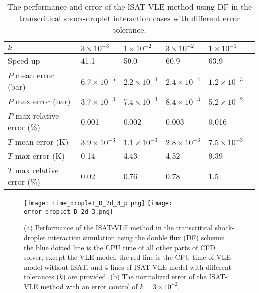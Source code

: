 \begin{table}%
	\caption{The performance and error of the ISAT-VLE method using DF in the transcritical shock-droplet interaction cases with different error tolerance.}\label{droplet_DF_table}
	\begin{tabular*}{0.9\textwidth}{@{} l|lllll@{} }
		\toprule
		$k$                        & $3\times 10^{-3}$   & $1\times 10^{-2}$    &$3\times 10^{-2}$    & $1\times 10^{-1}$\\
		\midrule
		Speed-up                   & 41.1                & 50.0                 & 60.9                & 63.9\\
		$P$ mean error (bar)       & $6.7\times 10^{-5}$ & $2.2\times 10^{-4}$  & $2.4\times 10^{-4}$ & $1.2\times 10^{-3}$\\
		$P$ max error (bar)        & $3.7\times 10^{-3}$ & $7.4\times 10^{-3}$  & $8.4\times 10^{-3}$ & $5.2\times 10^{-2}$ \\
		$P$ max relative error (\%)& 0.001               & 0.002                & 0.003               & 0.016 \\
		$T$ mean error (K)         & $3.9\times 10^{-3}$ & $1.1\times 10^{-3}$  & $2.8\times 10^{-3}$ & $7.5\times 10^{-3}$\\
		$T$ max error (K)          & 0.14                & 4.43                 & 4.52                & 9.39\\
		$T$ max relative error (\%)& 0.02                & 0.76                 & 0.78                & 1.5 \\
		\bottomrule
	\end{tabular*}
\end{table}

\begin{figure}[htbp]
	\centering
	\texttt{[image: time\_droplet\_D\_2d\_3\_p.png]}
	\texttt{[image: error\_droplet\_D\_2d\_3.png]}
	\caption{(a) Performance of the ISAT-VLE method in the transcritical shock-droplet interaction simulation using the double flux (DF) scheme: the blue dotted line is the CPU time of all other parts of CFD solver, except the VLE model; the red line is the CPU time of VLE model without ISAT, and 4 lines of ISAT-VLE model with different tolerances ($k$) are provided. (b) The normalized error of the ISAT-VLE method with an error control of $k = 3 \times 10^{-2}$.}
	\label{droplet_PE_D}
\end{figure}

